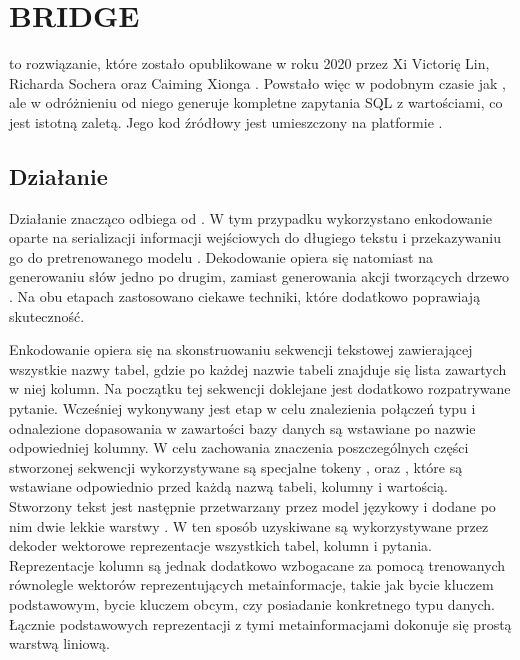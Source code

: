 \section{BRIDGE}
 to rozwiązanie, które zostało opublikowane w roku 2020 przez Xi Victorię Lin, Richarda Sochera oraz Caiming Xionga . Powstało więc w podobnym czasie jak , ale w odróżnieniu od niego generuje kompletne zapytania SQL z wartościami, co jest istotną zaletą. Jego kod źródłowy jest umieszczony na platformie  .

\subsection{Działanie}
Działanie  znacząco odbiega od . W tym przypadku wykorzystano enkodowanie oparte na serializacji informacji wejściowych do długiego tekstu i przekazywaniu go do pretrenowanego modelu . Dekodowanie opiera się natomiast na generowaniu słów jedno po drugim, zamiast generowania akcji tworzących drzewo . Na obu etapach zastosowano ciekawe techniki, które dodatkowo poprawiają skuteczność.

Enkodowanie opiera się na skonstruowaniu sekwencji tekstowej zawierającej wszystkie nazwy tabel, gdzie po każdej nazwie tabeli znajduje się lista zawartych w niej kolumn. Na początku tej sekwencji doklejane jest dodatkowo rozpatrywane pytanie. Wcześniej wykonywany jest etap  w celu znalezienia połączeń typu  i odnalezione dopasowania w zawartości bazy danych są  wstawiane po nazwie odpowiedniej kolumny. W celu zachowania znaczenia poszczególnych części stworzonej sekwencji wykorzystywane są specjalne tokeny \code{[T]}, \code{[C]} oraz \code{[V]}, które są wstawiane odpowiednio przed każdą nazwą tabeli, kolumny i wartością. Stworzony tekst jest następnie przetwarzany przez model językowy  i dodane po nim dwie lekkie warstwy . W ten sposób uzyskiwane są wykorzystywane przez dekoder wektorowe reprezentacje wszystkich tabel, kolumn i pytania. Reprezentacje kolumn są jednak dodatkowo wzbogacane za pomocą trenowanych równolegle wektorów reprezentujących metainformacje, takie jak bycie kluczem podstawowym, bycie kluczem obcym, czy posiadanie konkretnego typu danych. Łącznie podstawowych reprezentacji z tymi metainformacjami dokonuje się prostą warstwą liniową.

